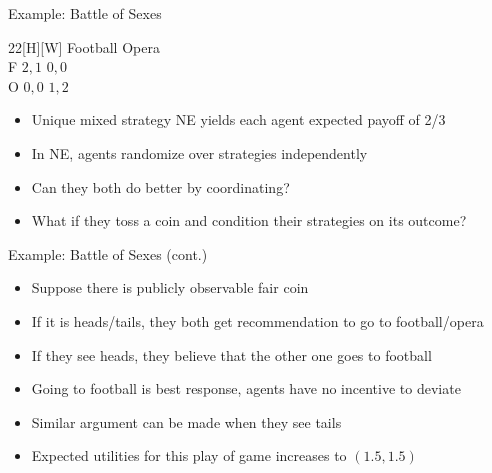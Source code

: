 \documentclass[11pt,aspectratio=169,handout]{beamer}
\begin{document}
  \begin{frame}{Example: Battle of Sexes}
   \begin{center}
    \hspace{-9.8em}
    \begin{game}{2}{2}[H][W]
      	\> Football		\> Opera		\\
     F	\> $2, 1$		\> $0, 0$	\\
     O	\> $0, 0$		\> $1, 2$
    \end{game}
   \end{center}
   \vspace{1em}
   \begin{itemize}[<+->]
   	\item Unique mixed strategy NE yields each agent expected payoff of 2/3
    \item In NE, agents randomize over strategies \alert{independently}
    \item Can they both do better by coordinating?
    \item What if they toss a coin and condition their strategies on its outcome?
   \end{itemize}
  \end{frame}

  \begin{frame}{Example: Battle of Sexes (cont.)}
   \begin{itemize}[<+->]
   \setlength{\itemsep}{1.1em}
    \item Suppose there is \alert{publicly observable} fair coin
    \item If it is heads/tails, they both get \alert{recommendation} to go to football/opera
    \item If they see heads, they believe that the other one goes to football
    \item Going to football is best response, agents have \alert{no incentive to deviate}
    \item Similar argument can be made when they see tails
    \item Expected utilities for this play of game \alert{increases} to $(1.5, 1.5)$
   \end{itemize}
  \end{frame}
  
\end{document}
